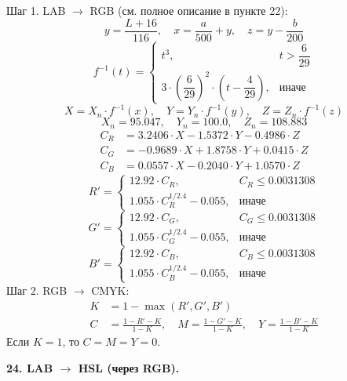 \documentclass[12pt,a4paper]{article}
\begin{document}
Шаг 1. LAB \(\to\) RGB (см. полное описание в пункте 22):
\[
y = \frac{L + 16}{116},\quad x = \frac{a}{500} + y,\quad z = y - \frac{b}{200}
\]
\[
f^{-1}(t) = \begin{cases} t^3, & t > \dfrac{6}{29} \\[8pt] 3 \cdot \left( \dfrac{6}{29} \right)^2 \cdot \left( t - \dfrac{4}{29} \right), & \text{иначе} \end{cases}
\]
\[
X = X_n \cdot f^{-1}(x),\quad Y = Y_n \cdot f^{-1}(y),\quad Z = Z_n \cdot f^{-1}(z)
\]
\[
X_n = 95.047,\quad Y_n = 100.0,\quad Z_n = 108.883
\]
\begin{align*}
C_R &= 3.2406 \cdot X - 1.5372 \cdot Y - 0.4986 \cdot Z \\
C_G &= -0.9689 \cdot X + 1.8758 \cdot Y + 0.0415 \cdot Z \\
C_B &= 0.0557 \cdot X - 0.2040 \cdot Y + 1.0570 \cdot Z
\end{align*}
\[
R' = \begin{cases} 12.92 \cdot C_R, & C_R \le 0.0031308 \\[8pt] 1.055 \cdot C_R^{1/2.4} - 0.055, & \text{иначе} \end{cases}
\]
\[
G' = \begin{cases} 12.92 \cdot C_G, & C_G \le 0.0031308 \\[8pt] 1.055 \cdot C_G^{1/2.4} - 0.055, & \text{иначе} \end{cases}
\]
\[
B' = \begin{cases} 12.92 \cdot C_B, & C_B \le 0.0031308 \\[8pt] 1.055 \cdot C_B^{1/2.4} - 0.055, & \text{иначе} \end{cases}
\]
Шаг 2. RGB \(\to\) CMYK:
\begin{align*}
K &= 1 - \max(R', G', B') \\
C &= \frac{1 - R' - K}{1 - K},\quad M = \frac{1 - G' - K}{1 - K},\quad Y = \frac{1 - B' - K}{1 - K}
\end{align*}
Если \(K = 1\), то \(C = M = Y = 0\).

\textbf{24. LAB \(\to\) HSL (через RGB).}
\end{document}
